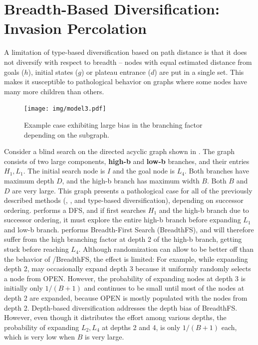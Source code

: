 \section{Breadth-Based Diversification:\\ Invasion Percolation}
\label{sec:ip}

A limitation of  type-based diversification based on path distance %
is that it does not diversify with respect to breadth -- 
nodes with equal estimated distance from goals ($h$), initial states ($g$) or plateau entrance ($d$) are put in a single set.
This makes it susceptible to pathological behavior on graphs where some nodes have many more children than others.

\begin{figure}[hbt]
 \centering
 \texttt{[image: img/model3.pdf]}
 \caption{Example case exhibiting large bias in the branching factor depending on the subgraph.}
 \label{fig:model}
\end{figure}

Consider a blind search on the directed acyclic graph
shown in .
The graph consists of two large components, \textbf{high-b} and \textbf{low-b} branches, and their entries $H_1,L_1$. The initial search node is $I$ and the goal node is $L_4$.
Both branches have maximum depth $D$, and the high-b branch has maximum width $B$.
Both $B$ and $D$ are very large.
This graph presents a pathological case for all of the previously described methods (\lifo, \fifo, \ro and type-based diversification), depending on successor ordering.
\lifo performs a DFS, and if \lifo first searches $H_1$ and the high-b branch due to successor ordering, it must explore the entire high-b branch before expanding $L_1$ and low-b branch.
\fifo performs Breadth-First Search (BreadthFS), and  will therefore suffer from the  high branching factor at depth 2 of the high-b branch, getting stuck before reaching $L_4$.
Although randomization can allow \ro to be better off than the behavior of \fifo/BreadthFS, the effect is limited:
For example, while expanding depth 2, \ro may occasionally expand depth 3 because it uniformly randomly selects a node from OPEN.
However, the probability of expanding nodes at depth 3 is initially only $1/(B+1)$ and continues to be small until  most of the nodes at depth 2 are expanded, 
because OPEN is mostly populated with the nodes from depth 2.
Depth-based diversification addresses the depth bias of BreadthFS.
However, even though it distributes the effort among various depths,
the probability of expanding $L_2,L_4$ at depths 2 and 4, is only $1/(B+1)$ each, which is very low when $B$ is very large.

